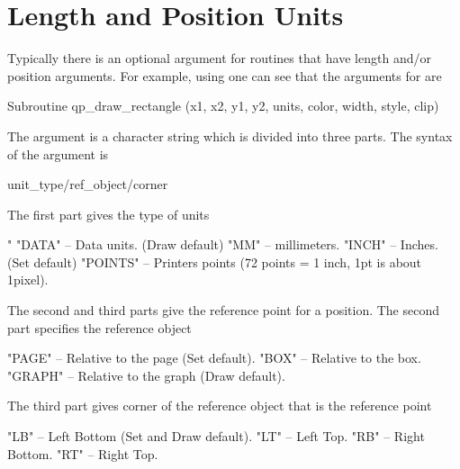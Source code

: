 \section{Length and Position Units}
\label{s:plot.units}

Typically there is an optional  argument for \quickplot routines that
have length and/or position arguments. For example, using  one can
see that the arguments for  are
\begin{example}
  Subroutine qp_draw_rectangle (x1, x2, y1, y2, units, color, width, style, clip)
\end{example}
The  argument is a character string which is divided into three
parts. The syntax of the  argument is
\begin{example}
  unit_type/ref_object/corner
\end{example}
The first part  gives the type of units
\begin{example}
  "%
  "DATA"    -- Data units. (Draw default)
  "MM"      -- millimeters.
  "INCH"    -- Inches. (Set default)
  "POINTS"  -- Printers points (72 points = 1 inch, 1pt is about 1pixel).
\end{example}
The second and third parts give the reference point for a position.
The second part specifies the reference object
\begin{example}
    "PAGE"  -- Relative to the page (Set default).
    "BOX"   -- Relative to the box.
    "GRAPH" -- Relative to the graph (Draw default).
\end{example}
The third part gives corner of the reference object that is the reference point
\begin{example}
    "LB"    -- Left Bottom (Set and Draw default).
    "LT"    -- Left Top.
    "RB"    -- Right Bottom.
    "RT"    -- Right Top.
\end{example}

